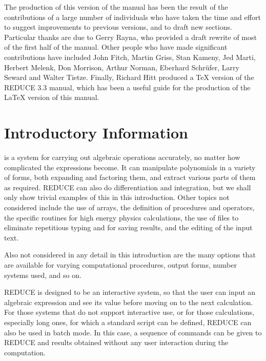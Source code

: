 \documentclass[11pt,letterpaper]{book}
\newcommand{\REDUCE}{REDUCE}
\begin{document}
The production of this version of the manual has been the result of the
contributions of a large number of individuals who have taken the time and
effort to suggest improvements to previous versions, and to draft new
sections.  Particular thanks are due to Gerry Rayna, who provided a draft
rewrite of most of the first half of the manual.  Other people who have
made significant contributions have included John Fitch, Martin Griss,
Stan Kameny, Jed Marti, Herbert Melenk, Don Morrison, Arthur Norman,
Eberhard Schr\"ufer, Larry Seward and Walter Tietze.  Finally, Richard
Hitt produced a {\TeX} version of the {\REDUCE} 3.3 manual, which has been
a useful guide for the production of the {\LaTeX} version of this manual.

\chapter{Introductory Information}

\index{Introduction}{\REDUCE} is a system for carrying out algebraic
operations accurately, no matter how complicated the expressions become.
It can manipulate polynomials in a variety of forms, both expanding and
factoring them, and extract various parts of them as required.  {\REDUCE} can
also do differentiation and integration, but we shall only show trivial
examples of this in this introduction.  Other topics not
considered include the use of arrays, the definition of procedures and
operators, the specific routines for high energy physics calculations, the
use of files to eliminate repetitious typing and for saving results, and
the editing of the input text.

Also not considered in any detail in this introduction are the many options
that are available for varying computational procedures, output forms,
number systems used, and so on.

{\REDUCE} is designed to be an interactive system, so that the user can input
an algebraic expression and see its value before moving on to the next
calculation.  For those systems that do not support interactive use, or
for those calculations, especially long ones, for which a standard script
can be defined, {\REDUCE} can also be used in batch mode. In this case,
a sequence of commands can be given to {\REDUCE} and results obtained
without any user interaction during the computation.
\end{document}

